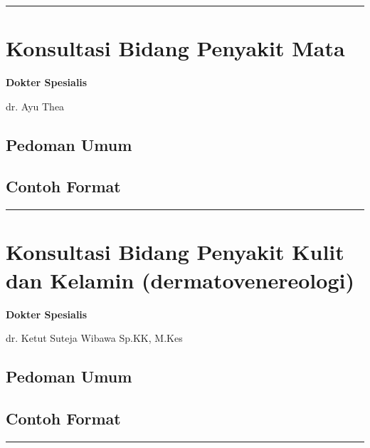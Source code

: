 \documentclass[
]{book}
\begin{document}
\begin{center}\rule{0.5\linewidth}{0.5pt}\end{center}

\hypertarget{konsultasi-bidang-penyakit-mata}{%
\section{Konsultasi Bidang Penyakit Mata}\label{konsultasi-bidang-penyakit-mata}}

\textbf{Dokter Spesialis}

dr. Ayu Thea

\hypertarget{pedoman-umum-8}{%
\subsection{Pedoman Umum}\label{pedoman-umum-8}}

\hypertarget{contoh-format-8}{%
\subsection{Contoh Format}\label{contoh-format-8}}

\begin{center}\rule{0.5\linewidth}{0.5pt}\end{center}

\hypertarget{konsultasi-bidang-penyakit-kulit-dan-kelamin-dermatovenereologi}{%
\section{Konsultasi Bidang Penyakit Kulit dan Kelamin (dermatovenereologi)}\label{konsultasi-bidang-penyakit-kulit-dan-kelamin-dermatovenereologi}}

\textbf{Dokter Spesialis}

dr. Ketut Suteja Wibawa Sp.KK, M.Kes

\hypertarget{pedoman-umum-9}{%
\subsection{Pedoman Umum}\label{pedoman-umum-9}}

\hypertarget{contoh-format-9}{%
\subsection{Contoh Format}\label{contoh-format-9}}

\begin{center}\rule{0.5\linewidth}{0.5pt}\end{center}
\end{document}
